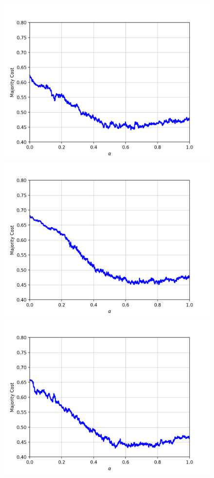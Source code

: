 \begin{figure}[H]
\begin{minipage}{.3\textwidth}
  \includegraphics[width=\linewidth]{plots/mnist-ac-2}
\end{minipage}
\begin{minipage}{.3\textwidth}
  \centering
  \includegraphics[width=\linewidth]{plots/mnist-ac-3}
\end{minipage}
\begin{minipage}{.3\textwidth}
  \centering
  \includegraphics[width=\linewidth]{plots/mnist-ac-4}

\end{minipage}
\end{figure}
